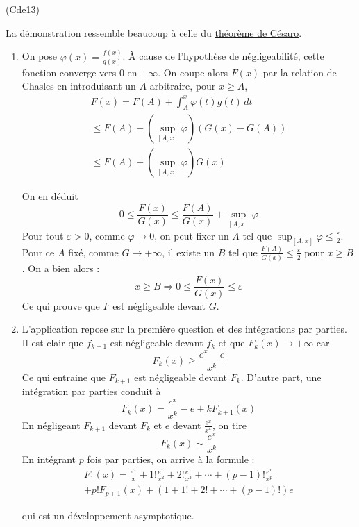 \begin{tiny}(Cde13)\end{tiny} La démonstration ressemble beaucoup à celle du \href{http://back.maquisdoc.net/v-1/index.php?act=chelt&id_elt=4881}{théorème de Césaro}.
\begin{enumerate}
 \item On pose $\varphi(x)=\frac{f(x)}{g(x)}$. \`A cause de l'hypothèse de négligeabilité, cette fonction converge vers $0$ en $+\infty$. On coupe alors $F(x)$ par la relation de Chasles en introduisant un $A$ arbitraire, pour $x\geq A$,
\begin{multline*}
 F(x) = F(A)+\int_A^x\varphi(t)g(t)\,dt\\
\leq F(A) + (\sup_{[A,x]}\varphi) (G(x)-G(A))\\
\leq F(A) + (\sup_{[A,x]}\varphi) G(x)
\end{multline*}

On en déduit
\begin{displaymath}
 0\leq\frac{F(x)}{G(x)}\leq \frac{F(A)}{G(x)} + \sup_{[A,x]}\varphi 
\end{displaymath}
Pour tout $\varepsilon >0$, comme $\varphi \rightarrow 0$, on peut fixer un $A$ tel que $\sup_{[A,x]}\varphi\leq \frac{\varepsilon}{2}$. Pour ce $A$ fixé, comme $G\rightarrow +\infty$, il existe un $B$ tel que $\frac{F(A)}{G(x)}\leq \frac{\varepsilon}{2}$ pour $x\geq B$. On a bien alors :
\begin{displaymath}
 x\geq B \Rightarrow 0\leq\frac{F(x)}{G(x)}\leq \varepsilon
\end{displaymath}
Ce qui prouve que $F$ est négligeable devant $G$.
\item L'application repose sur la première question et des intégrations par parties.
Il est clair que $f_{k+1}$ est négligeable devant $f_k$ et que $F_k(x)\rightarrow +\infty$ car
\begin{displaymath}
 F_k(x) \geq \frac{e^x -e }{x^k}
\end{displaymath}
Ce qui entraine que $F_{k+1}$ est négligeable devant $F_k$. D'autre part, une intégration par parties conduit à 
\begin{displaymath}
 F_k(x) = \frac{e^x}{x^k} -e + kF_{k+1}(x)
\end{displaymath}
En négligeant $F_{k+1}$ devant $F_k$ et $e$ devant $\frac{e^x}{x^k}$, on tire
\begin{displaymath}
 F_k(x) \sim  \frac{e^x}{x^k}
\end{displaymath}
En intégrant $p$ fois par parties, on arrive à la formule :
\begin{multline*}
 F_1(x) = \frac{e^x}{x}+1!\frac{e^x}{x^2}+2!\frac{e^x}{x^3}+\cdots+(p-1)!\frac{e^x}{x^p}\\
+p!F_{p+1}(x)+\left( 1+1!+2!+\cdots+(p-1)!\right)e 
\end{multline*}

qui est un développement asymptotique.
\end{enumerate}
